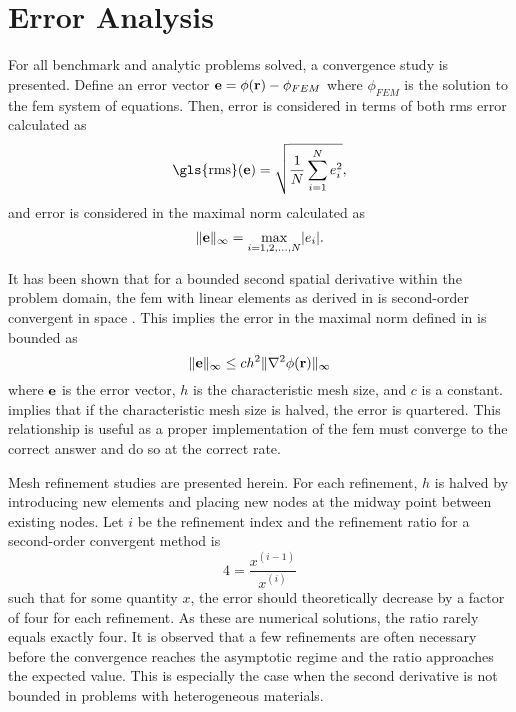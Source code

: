 \section{Error Analysis}
  For all benchmark and analytic problems solved, a convergence study is 
  presented. Define an error vector $\mathbf{e} = \phi(\mathbf{r}) - \phi_{FEM}$ where
  $\phi_{FEM}$ is the solution to the \gls{fem} system of equations. Then, 
  error is considered in terms of both \gls{rms} error calculated as 
  \begin{equation} 
    \label{eq:rms}
    \text{\gls{rms}}(\ve) = \sqrt{\frac{1}{N} \sum_{i=1}^{N} e_i^2},
  \end{equation}
  and error is considered in the maximal norm calculated as
  \begin{equation} 
    \label{eq:infnorm}
    \|\mathbf{e}\|_{\infty} = \max_{i=1,2,\ldots,N} \lvert e_i \rvert.
  \end{equation}

  It has been shown that for a bounded second spatial derivative 
  within the problem domain, the \gls{fem} with linear elements as derived in 
   is second-order convergent in space 
  \cite{textbookli}. This implies the error in the maximal norm defined in 
   is bounded as
  \begin{equation} 
    \label{eq:error_bound}
    \|\mathbf{e}\|_{\infty} \le c h^2 \| \mathbf{\nabla}^2 \phi(\mathbf{r}) \|_{\infty}
  \end{equation}
  where $\mathbf{e}$ is the error vector, $h$ is the characteristic mesh size, and $c$
  is a constant.  implies that if the characteristic mesh 
  size is halved, the error is quartered. This relationship is useful as a 
  proper implementation of the \gls{fem} must converge to the correct answer and 
  do so at the correct rate.
  
  Mesh refinement studies are presented herein. For each refinement, $h$ is 
  halved by introducing new elements and placing new nodes at the midway point
  between existing nodes. Let $i$ be the refinement index and the refinement 
  ratio for a second-order convergent method is 
  \begin{equation}
    4 = \frac{x^{(i-1)}}{x^{(i)}}
  \end{equation}
  such that for some quantity $x$, the error should theoretically decrease by a
  factor of four for each refinement. As these are numerical solutions, the 
  ratio rarely equals exactly four. It is observed that a few refinements are 
  often necessary before the convergence reaches the asymptotic regime and the 
  ratio approaches the expected value. This is especially the case when the 
  second derivative is not bounded in problems with heterogeneous materials.
  
